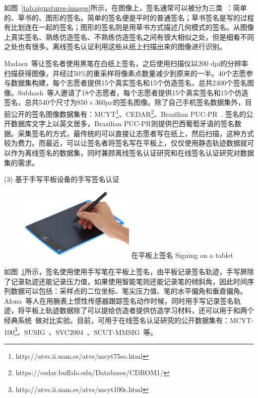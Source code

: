\begin{table}[!hpb]
\begin{tabular}{|c|m{}|m{}|m{}|}
        \bottomrule
  \end{tabular}
\end{table}

如图~\ref{tab:signatures-images}所示，在图像上，签名通常可以被分为三类~\cite{Hanmandlu2005Off}：简单的、草书的、图形的签名。简单的签名便是平时的普通签名；草书签名是写的过程有比划连在一起的签名；图形的签名则是用草书方式描述几何模式的签名。从图像上真实签名、熟练仿造签名、不熟练仿造签名之间有很大相似之处，但是细看不同之处也有很多。离线签名认证利用这些从纸上扫描出来的图像进行识别。

Madasu~\cite{Hanmandlu2005Off}等让签名者使用黑笔在白纸上签名，之后使用扫描仪以200 dpi的分辨率扫描获得图像，并经过50\%的重采样将像素点数量减少到原来的一半。40个志愿参与数据集构建，每个志愿者提供15个真实签名和15个仿造签名，总共2400个签名图像。Subhash~\cite{chandra2016offline}等人邀请了18个志愿者，每个志愿者提供15个真实签名和15个仿造签名，总共540个尺寸为$850\times360px$的签名图像。除了自己手机签名数据集外，目前公开的签名图像数据集有：MCYT\footnote{http://atvs.ii.uam.es/atvs/mcyt75so.html}、CEDAR\footnote{https://cedar.buffalo.edu/Databases/CDROM1/}、Brazilian PUC-PR~\cite{freitas2008brazilian}. 签名的公开数据库文字上以英文居多，Brazilian PUC-PR则提供巴西葡萄牙语的签名数据。采集签名的方式，最传统的可以直接让志愿者写在纸上，然后扫描，这种方式较为费力。而最近，可以让签名者将签名写在平板上，仅仅使用静态轨迹数据就可以作为离线签名的数据集，同时兼顾离线签名认证研究和在线签名认证研究对数据集的需求。

(3) 基于手写平板设备的手写签名认证

\begin{figure}[!htp]
  \centering
  \includegraphics[width=0.5\textwidth]{figure/tablet.png}
  \bicaption
    {在平板上签名}
    {Signing on a tablet}
  \label{fig:signing-tablet}
\end{figure}
如图~\ref{fig:signing-tablet}所示，签名使用使用手写笔在平板上签名，由平板记录签名轨迹，手写屏除了记录轨迹还能记录压力值，如果使用智能笔则还能记录笔的倾斜角，因此时间序列数据可以包括：采样点的二位坐标、笔尖压力值、笔的水平偏角和垂直偏角。Alona~\cite{Levy2018Handwritten}等人在用腕表上惯性传感器跟踪签名动作时候，同时用手写记录签名轨迹，将平板上轨迹数据除了可以提给仿造者提供仿造学习材料，还可以用于和两个经典系统~\cite{fischer2015robust,kholmatov2005identity}做对比实验。目前，可用于在线签名认证研究的公开数据集有：MCYT-100\footnote{http://atvs.ii.uam.es/atvs/mcyt100s.html}、SUSIG~\cite{kholmatov2006sigsa}、SVC2004~\cite{10.1007/978-3-540-25948-0_3}、SCUT-MMSIG~\cite{10.1007/978-3-319-69923-3_78}等。

